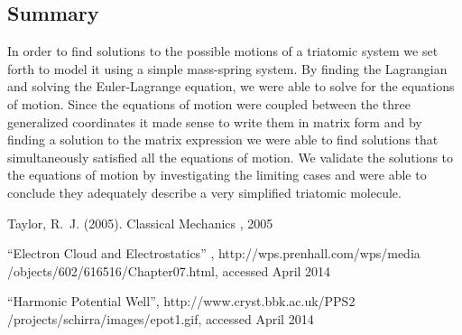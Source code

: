 \documentclass[hidelinks]{article}
\begin{document}
\begin{multicols}{2}
\section{Summary}
In order to find solutions to the possible motions of a triatomic system we set forth to model it using a simple mass-spring system. By finding the Lagrangian and solving the Euler-Lagrange equation, we were able to solve for the equations of motion. Since the equations of motion were coupled between the three generalized coordinates it made sense to write them in matrix form and by finding a solution to the matrix expression we were able to find solutions that simultaneously satisfied all the equations of motion. We validate the solutions to the equations of motion by investigating the limiting cases and were able to conclude they adequately describe a very simplified triatomic molecule.

 
 
 




\begin{thebibliography}{99} %

Taylor, R.~J. (2005).
\newblock Classical Mechanics
, 2005

``Electron Cloud and Electrostatics'' ,
\newblock http://wps.prenhall.com/wps/media
\newblock/objects/602/616516/Chapter07.html,
\newblock accessed April 2014


``Harmonic Potential Well'', 
\newblock http://www.cryst.bbk.ac.uk/PPS2
\newblock/projects/schirra/images/epot1.gif,
\newblock accessed April 2014 

\end{thebibliography}


\end{multicols}
\end{document}
